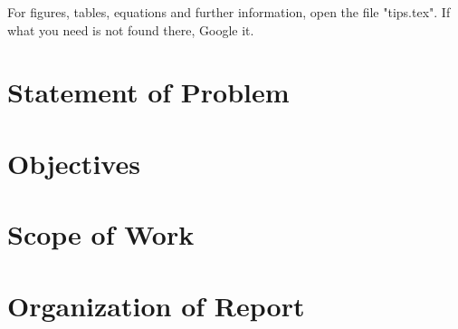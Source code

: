 For figures, tables, equations and further information, open the file "tips.tex". If what you need is not found there, Google it.

\fi

\section{Statement of Problem}



\section{Objectives}



\section{Scope of Work}



\section{Organization of Report}

